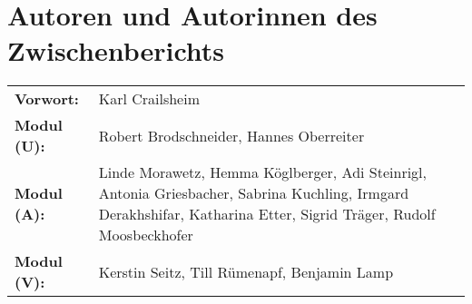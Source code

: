 {}
\section*{Autoren und Autorinnen des Zwischenberichts}
\label{cha:authoren}

\vspace{20mm}


\begin{tabularx}{\textwidth}{l X} 

    \textbf{Vorwort:} &
    Karl Crailsheim \\

    \textbf{Modul (U):} &
    Robert Brodschneider, Hannes Oberreiter \\

    \textbf{Modul (A):} &
    Linde Morawetz, Hemma Köglberger, Adi Steinrigl, \newline
    Antonia Griesbacher, Sabrina Kuchling, Irmgard Derakhshifar, Katharina Etter,
    Sigrid Träger, Rudolf Moosbeckhofer \\

    \textbf{Modul (V):} &
    Kerstin Seitz, Till Rümenapf, Benjamin Lamp \\

\end{tabularx}


